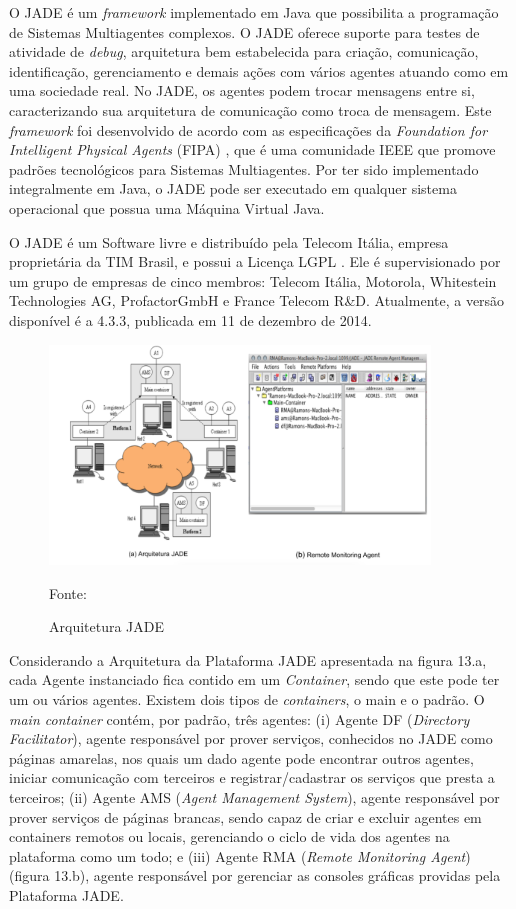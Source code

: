 O JADE \cite{telecon2014} é um \textit{framework} implementado em Java que possibilita a programação de Sistemas Multiagentes complexos. O JADE oferece suporte para testes de atividade de \textit{debug}, arquitetura bem estabelecida para criação, comunicação, identificação, gerenciamento e demais ações com vários agentes atuando como em uma sociedade real. No JADE, os agentes podem trocar mensagens entre si, caracterizando sua arquitetura de comunicação como troca de mensagem. Este \textit{framework} foi desenvolvido de acordo com as especificações da \textit{Foundation for Intelligent Physical Agents} (FIPA) \cite{telecon2014}, que é uma comunidade IEEE que promove padrões tecnológicos para Sistemas Multiagentes. Por ter sido implementado integralmente em Java, o JADE pode ser executado em qualquer sistema operacional que possua uma Máquina Virtual Java.

O JADE é um Software livre e distribuído pela Telecom Itália, empresa proprietária da TIM Brasil, e possui a Licença LGPL \cite{telecon2014}. Ele é supervisionado por um grupo de empresas de cinco membros: Telecom Itália, Motorola, Whitestein Technologies AG, ProfactorGmbH e France Telecom R\&D. Atualmente, a versão disponível é a 4.3.3, publicada em 11 de dezembro de 2014.

\begin{figure}[h!]
\centering
\label{f10}
\includegraphics[width=0.9\textwidth]{figuras/f08}
\caption{Arquitetura JADE} {Fonte: \cite{telecon2014}}
\end{figure}
\FloatBarrier

Considerando a Arquitetura da Plataforma JADE apresentada na figura 13.a, cada Agente instanciado fica contido em um \textit{Container}, sendo que este pode ter um ou vários agentes. Existem dois tipos de \textit{containers}, o main e o padrão. O \textit{main container} contém, por padrão, três agentes: (i) Agente DF (\textit{Directory Facilitator}), agente responsável por prover serviços, conhecidos no JADE como páginas amarelas, nos quais um dado agente pode encontrar outros agentes, iniciar comunicação com terceiros e registrar/cadastrar os serviços que presta a terceiros; (ii) Agente AMS (\textit{Agent Management System}), agente responsável por prover serviços de páginas brancas, sendo capaz de criar e excluir agentes em containers remotos ou locais, gerenciando o ciclo de vida dos agentes na plataforma como um todo; e (iii) Agente RMA (\textit{Remote Monitoring Agent}) (figura 13.b), agente responsável por gerenciar as consoles gráficas providas pela Plataforma JADE.

